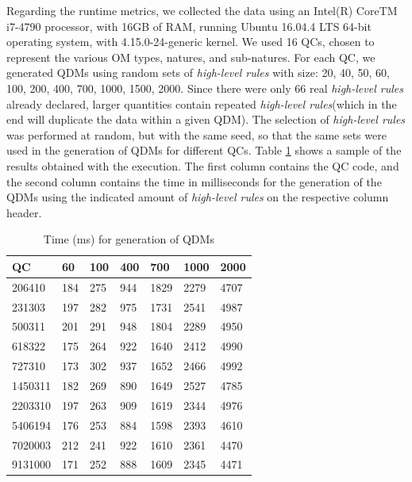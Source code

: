 \documentclass{bmcart}
\newcommand{\callers}{\emph{high-level rules}\xspace}
\begin{document}
Regarding the runtime metrics, we collected the data using an Intel(R) Core{TM} i7-4790 processor, with 16GB of RAM, running Ubuntu 16.04.4 LTS 64-bit operating system, with 4.15.0-24-generic kernel. We used 16 QCs, chosen to represent the various OM types, natures, and sub-natures. For each QC, we generated QDMs using random sets of \callers with size: 20, 40, 50, 60, 100, 200, 400, 700, 1000, 1500, 2000. Since there were only 66 real \callers already declared, larger quantities contain repeated \callers (which in the end will duplicate the data within a given QDM). The selection of \callers was performed at random, but with the same seed, so that the same sets were used in the generation of QDMs for different QCs. Table \ref{table:tempo} shows a sample of the results obtained with the execution. The first column contains the QC code, and the second column contains the time in milliseconds for the generation of the QDMs using the indicated amount of \callers on the respective column header.

\begin{table}[htb!]
	\centering
	\caption{Time (ms) for generation of QDMs}
	\label{table:tempo}
	\begin{center}
		\begin{tabular}{lllllll}
			\toprule
			\textbf{QC}      & \textbf{60}  & \textbf{100} & \textbf{400}  & \textbf{700}  & \textbf{1000} & \textbf{2000} \\ \midrule
			
			206410  & 184 & 275 & 944  & 1829 & 2279 & 4707 \\ %
			231303  & 197 & 282 & 975  & 1731 & 2541 & 4987 \\ %
			500311  & 201 & 291 & 948  & 1804 & 2289 & 4950 \\ %
			618322  & 175 & 264 & 922  & 1640 & 2412 & 4990 \\ %
			727310  & 173 & 302 & 937  & 1652 & 2466 & 4992 \\ %
			1450311 & 182 & 269 & 890  & 1649 & 2527 & 4785 \\ %
			2203310 & 197 & 263 & 909  & 1619 & 2344 & 4976 \\ %
			5406194 & 176 & 253 & 884  & 1598 & 2393 & 4610 \\ %
			7020003 & 212 & 241 & 922  & 1610 & 2361 & 4470 \\ %
			9131000 & 171 & 252 & 888  & 1609 & 2345 & 4471 \\ \bottomrule
		\end{tabular}
	\end{center}
\end{table}
\end{document}
